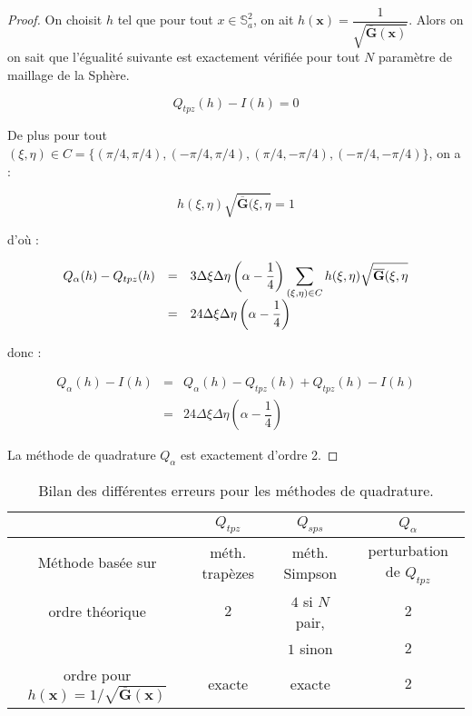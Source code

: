 \begin{proof}
On choisit $h$ tel que pour tout $x \in \mathbb{S}_a^2$, on ait $h(\mathbf{x})=\dfrac{1}{\sqrt{\overline{\mathbf{G}}(\mathbf{x})}}$. Alors on on sait que l'égualité suivante est exactement vérifiée pour tout $N$ paramètre de maillage de la Sphère.

\begin{equation}
Q_{tpz}(h)-I(h)=0
\end{equation}

De plus pour tout $(\xi,\eta) \in C=\{(\pi/4,\pi/4),(-\pi/4,\pi/4),(\pi/4,-\pi/4),(-\pi/4,-\pi/4) \}$, on a :

\begin{equation}
h(\xi,\eta)\sqrt{\overline{\mathbf{G}}(\xi,\eta}=1
\end{equation}

d'où :

\begin{equation*}
\begin{array}{rcl}
Q_{\alpha}(h)-Q_{tpz}(h) & = & 3 \Delta \xi \Delta \eta \left( \alpha - \dfrac{1}{4} \right)\displaystyle\sum\limits_{(\xi,\eta)\in C} h(\xi,\eta)\sqrt{\overline{\mathbf{G}}(\xi,\eta} \\
                         & = & 24 \Delta \xi \Delta \eta \left( \alpha - \dfrac{1}{4} \right)
\end{array}
\end{equation*}

donc :

\begin{equation*}
\begin{array}{rcl}
Q_{\alpha}(h) - I(h) & = & Q_{\alpha}(h) - Q_{tpz}(h) + Q_{tpz}(h) - I(h) \\
                    & = & 24 \Delta \xi \Delta \eta \left( \alpha - \dfrac{1}{4} \right)
\end{array}
\end{equation*}

La méthode de quadrature $Q_{\alpha}$ est exactement d'ordre 2.
\end{proof}




\begin{table}
\begin{center}
\begin{tabular}{c||c|c|c}
    & $Q_{tpz}$ & $Q_{sps}$ & $Q_{\alpha}$ \\
\hline
\hline
Méthode basée sur & méth. trapèzes & méth. Simpson & perturbation de $Q_{tpz}$ \\
\hline
ordre théorique & $2$ & $4$ si $N$ pair, & $2$ \\
                &     &      $1$ sinon   & $2$ \\
\hline
ordre pour $h(\mathbf{x})=1/\sqrt{\overline{\mathbf{G}}(\mathbf{x})}$ &  exacte & exacte & $2$
\end{tabular}
\end{center}
\caption{Bilan des différentes erreurs pour les méthodes de quadrature.}
\end{table}

